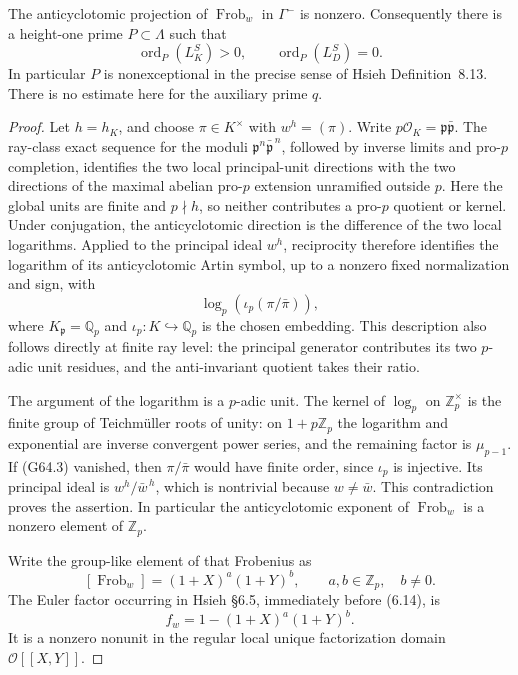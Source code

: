 \begin{lemma}
\label{AC-G64-prime}
The anticyclotomic projection of $\operatorname{Frob}_w$ in
$\Gamma^-$ is nonzero.  Consequently there is a height-one prime
$P\subset\Lambda$ such that
\[
       \operatorname{ord}_P(L_K^S)>0,
       \qquad \operatorname{ord}_P(L_D^S)=0.                \tag{G64.2}
\]
In particular $P$ is nonexceptional in the precise sense of
Hsieh Definition~8.13.  There is no estimate here for the auxiliary
prime $q$.
\end{lemma}
\begin{proof}
Let $h=h_K$, and choose $\pi\in K^\times$ with
$w^h=(\pi)$.  Write $p\mathcal O_K=\mathfrak p\bar{\mathfrak p}$.
The ray-class exact sequence for the moduli
$\mathfrak p^n\bar{\mathfrak p}^{\,n}$, followed by inverse limits and pro-$p$
completion, identifies the two local principal-unit directions
with the two directions of the maximal abelian pro-$p$ extension
unramified outside $p$.  Here the global units are finite and
$p\nmid h$, so neither contributes a pro-$p$ quotient or kernel.
Under conjugation, the anticyclotomic direction is the difference
of the two local logarithms.  Applied to the principal ideal
$w^h$, reciprocity therefore identifies the logarithm of its
anticyclotomic Artin symbol, up to a nonzero fixed normalization
and sign, with
\[
                \log_p(\iota_p(\pi/\bar\pi)),              \tag{G64.3}
\]
where $K_{\mathfrak p}=\mathbb Q_p$ and $\iota_p:K\hookrightarrow\mathbb Q_p$
is the chosen embedding.  This description also follows directly
at finite ray level: the principal generator contributes its two
$p$-adic unit residues, and the anti-invariant quotient takes
their ratio.

The argument of the logarithm is a $p$-adic unit.  The kernel of
$\log_p$ on $\mathbb Z_p^\times$ is the finite group of
Teichm\"uller roots of unity: on $1+p\mathbb Z_p$ the logarithm
and exponential are inverse convergent power series, and the
remaining factor is $\mu_{p-1}$.  If (G64.3) vanished, then
$\pi/\bar\pi$ would have finite order, since $\iota_p$ is
injective.  Its principal ideal is $w^h/\bar w^{\,h}$,
which is nontrivial because $w\ne\bar w$.  This contradiction
proves the assertion.  In particular the anticyclotomic exponent
of $\operatorname{Frob}_w$ is a nonzero element of $\mathbb Z_p$.

Write the group-like element of that Frobenius as
\[
       [\operatorname{Frob}_w]=(1+X)^a(1+Y)^b,
          \qquad a,b\in\mathbb Z_p,\quad b\ne0.
\]
The Euler factor occurring in Hsieh \S6.5, immediately before
(6.14), is
\[
       f_w=1-(1+X)^a(1+Y)^b.                              \tag{G64.4}
\]
It is a nonzero nonunit in the regular local unique factorization
domain $\mathcal O[[X,Y]]$.


\end{proof}
